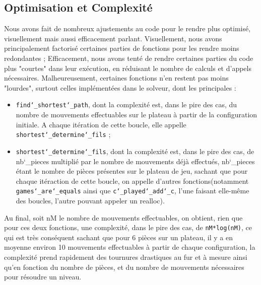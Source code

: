 \documentclass[12pt]{article}
\begin{document}
\subsection{Optimisation et Complexité}
Nous avons fait de nombreux ajustements au code pour le rendre plus optimisé, visuellement mais aussi efficacement parlant.
Visuellement, nous avons principalement factorisé certaines parties de fonctions pour les rendre moins redondantes ;
Efficacement, nous avons tenté de rendre certaines parties du code plus "courtes" dans leur exécution, en réduisant le nombre de calculs et d'appels nécessaires. Malheureusement, certaines fonctions n'en restent pas moins "lourdes", surtout celles implémentées dans le solveur, dont les principales :
\begin{itemize}
\item \texttt{find\char`_shortest\char`_path}, dont la complexité est, dans le pire des cas, du nombre de mouvements effectuables sur le plateau à partir de la configuration initiale. A chaque itération de cette boucle, elle appelle \texttt{shortest\char`_determine\char`_fils} ;
\item \texttt{shortest\char`_determine\char`_fils}, dont la complexité est, dans le pire des cas, de nb\char`_pieces multiplié par le nombre de mouvements déjà effectués, nb\char`_pieces étant le nombre de pièces présentes sur le plateau de jeu, sachant que pour chaque itéraction de cette boucle, on appelle d'autres fonctions(notamment \texttt{games\char`_are\char`_equals} ainsi que \texttt{c\char`_played\char`_add\char`_c}, l'une faisant elle-même des boucles, l'autre pouvant appeler un realloc).
\end{itemize}
Au final, soit nM le nombre de mouvements effectuables, on obtient, rien que pour ces deux fonctions, une complexité, dans le pire des cas, de \texttt{nM*log(nM)}, ce qui est très conséquent sachant que pour 6 pièces sur un plateau, il y a en moyenne environ 10 mouvements effectuables à partir de chaque configuration, la complexité prend rapidement des tournures drastiques au fur et à mesure ainsi qu'en fonction du nombre de pièces, et du nombre de mouvements nécessaires pour résoudre un niveau.
\end{document}
